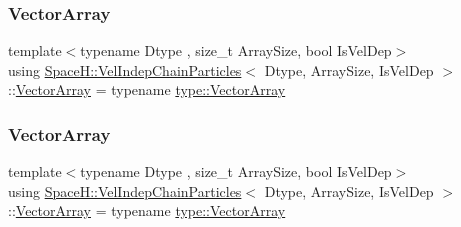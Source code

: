 \mbox{\label{class_space_h_1_1_vel_indep_chain_particles_a426b0d83a634a818998a8f29e89f983c}} 
\subsubsection{\texorpdfstring{Vector\+Array}{VectorArray}\hspace{0.1cm}{\footnotesize\ttfamily [1/2]}}
{\footnotesize\ttfamily template$<$typename Dtype , size\+\_\+t Array\+Size, bool Is\+Vel\+Dep$>$ \\
using \mbox{\hyperlink{class_space_h_1_1_vel_indep_chain_particles}{Space\+H\+::\+Vel\+Indep\+Chain\+Particles}}$<$ Dtype, Array\+Size, Is\+Vel\+Dep $>$\+::\mbox{\hyperlink{class_space_h_1_1_vel_indep_particles_aa9983058940249df8b00fa800e8cbad2}{Vector\+Array}} =  typename \mbox{\hyperlink{struct_space_h_1_1_proto_type_a622b8e122b33bb4966a02299fb7b82d6}{type\+::\+Vector\+Array}}}

\mbox{\label{class_space_h_1_1_vel_indep_chain_particles_a426b0d83a634a818998a8f29e89f983c}} 
\subsubsection{\texorpdfstring{Vector\+Array}{VectorArray}\hspace{0.1cm}{\footnotesize\ttfamily [2/2]}}
{\footnotesize\ttfamily template$<$typename Dtype , size\+\_\+t Array\+Size, bool Is\+Vel\+Dep$>$ \\
using \mbox{\hyperlink{class_space_h_1_1_vel_indep_chain_particles}{Space\+H\+::\+Vel\+Indep\+Chain\+Particles}}$<$ Dtype, Array\+Size, Is\+Vel\+Dep $>$\+::\mbox{\hyperlink{class_space_h_1_1_vel_indep_particles_aa9983058940249df8b00fa800e8cbad2}{Vector\+Array}} =  typename \mbox{\hyperlink{struct_space_h_1_1_proto_type_a622b8e122b33bb4966a02299fb7b82d6}{type\+::\+Vector\+Array}}}



